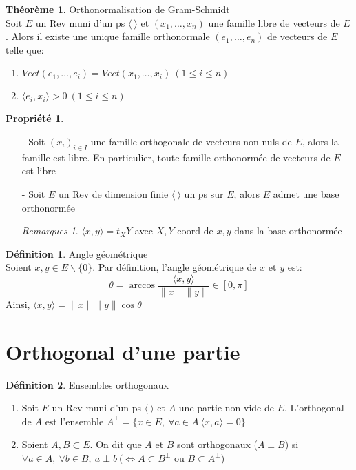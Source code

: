 \documentclass[fleqn]{article}
\theoremstyle{definition} \newtheorem*{defi}{D\'efinition}
\theoremstyle{definition} \newtheorem*{theo}{Th\'eor\`eme}
\theoremstyle{definition} \newtheorem*{coro}{Corollaire}
\theoremstyle{remark} \newtheorem*{rqs}{Remarques}
\theoremstyle{definition} \newtheorem*{prop}{Propri\'et\'e}
\begin{document}
\begin{theo} Orthonormalisation de Gram-Schmidt \\
	Soit $E$ un Rev muni d'un ps $\langle\ \rangle$ et $(x_1, \hdots, x_n)$ une famille libre de vecteurs de $E$. Alors il existe une unique
	famille orthonormale $(e_1, \hdots, e_n)$ de vecteurs de $E$ telle que:
	\begin{enumerate}
		\item $Vect(e_1, \hdots, e_i) = Vect(x_1, \hdots, x_i)\ (1 \leq i \leq n)$
		\item $\langle e_i,x_i \rangle > 0\ (1 \leq i \leq n)$
	\end{enumerate}
\end{theo}

\begin{prop} $ $
	\begin{enumerate}
		\item [-] Soit $(x_i)_{i\in I}$ une famille orthogonale de vecteurs non nuls de $E$, alors la famille est libre. En particulier, toute
			famille orthonorm\'ee de vecteurs de $E$ est libre
		\item [-] Soit $E$ un Rev de dimension finie  $\langle\ \rangle$ un ps sur $E$, alors $E$ admet une base orthonorm\'ee
			\begin{rqs} $\langle x,y \rangle = t_X Y$ avec $X,Y$ coord de $x,y$ dans la base orthonorm\'ee \end{rqs}
	\end{enumerate}
\end{prop}

\begin{defi} Angle g\'eom\'etrique \\
	Soient $x,y \in E\backslash \{0\}$. Par d\'efinition, l'angle g\'eom\'etrique de $x$ et $y$ est:
	\[\theta = \arccos \frac{\langle x,y \rangle}{\|x\| \|y\|} \in [0, \pi]\]
	Ainsi, $\langle x,y \rangle = \|x\| \|y\| \cos \theta$
\end{defi}

\section{Orthogonal d'une partie}
\begin{defi} Ensembles orthogonaux
	\begin{enumerate}
		\item Soit $E$ un Rev muni d'un ps $\langle\ \rangle$ et $A$ une partie non vide de $E$. L'orthogonal de $A$ est l'ensemble $A^{\perp} =
			\{x \in E,\ \forall a \in A\ \langle x,a \rangle = 0\}$
		\item Soient $A,B \subset E$. On dit que $A$ et $B$ sont orthogonaux ($A \perp B$) si $\forall a \in A,\ \forall b \in B,\ a \perp b
			\ (\Leftrightarrow A \subset B^\perp$ ou $B \subset A^\perp$)
	\end{enumerate}
\end{defi}
\end{document}
